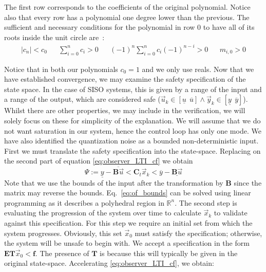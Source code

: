 \documentclass[runningheads,a4paper]{llncs}
\newcommand{\mat}[1]{\boldsymbol{#1}}
\begin{document}
The first row corresponds to the coefficients of the original polynomial. 
Notice also that every row has a polynomial one degree lower than the previous. 
The sufficient and necessary conditions for the polynomial in row $0$ 
to have all of its roots inside the unit circle are~\cite{astrom1997computer}:
%
\begin{align}
|c_n|<c_0&&
\sum_{i=0}^n c_i > 0&&
(-1)^n\sum_{i=0}^n c_i (-1)^{n-i}> 0&&
m_{i,0}>0
\end{align}

Notice that in both our polynomials $c_0=1$ and we only use reals.
Now that we have established convergence, we may examine the safety 
specification of the state space. In the case of SISO systems, 
this is given by a range of the input and a range of the output, 
which are considered safe ($\vec{u}_k \in [\underline{u}\ \ \overline{u}] \wedge \vec{y}_k \in [\underline{y}\ \ \overline{y}]$). 
Whilst there are other properties, we may include in the verification, 
we will solely focus on these for simplicity of the explanation.
We will assume that we do not want saturation in our system, 
hence the control loop has only one mode. We have also identified 
the quantization noise as a bounded non-deterministic input.
First we must translate the safety specification into the state-space. 
Replacing on the second part of equation \eqref{eq:observer_LTI_cf} we obtain
%
\begin{equation}
\Psi := \underline{y}-\overline{\mat{B}\vec{u}}<\mat{C}_t\vec{x}_k<\overline{y}-\underline{\mat{B}\vec{u}}
\label{eq:of_bounds}
\end{equation}
Note that we use the bounds of the input after the transformation by $\mat{B}$ 
since the matrix may reverse the bounds. Eq.~\eqref{eq:of_bounds} can be solved 
using linear programming as it describes a polyhedral region in $\mathbb{R}^n$.
The second step is evaluating the progression of the system over time to calculate 
$\vec{x}_k$ to validate against this specification. For this step we require 
an initial set from which the system progresses. Obviously, this set $\vec{x}_0$ 
must satisfy the specification; otherwise, the system will be unsafe to begin with.
We accept a specification in the form $\mat{E}\mat{T}\vec{x}_0<\mat{f}$. 
The presence of $\mat{T}$ is because this will typically be given in the original 
state-space. Accelerating \eqref{eq:observer_LTI_cf}, we obtain:
%
\end{document}
